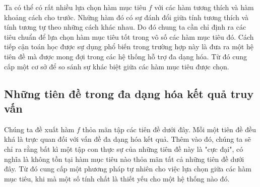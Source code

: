 \documentclass[12pt]{report}
\begin{document}
Ta có thể có rất nhiều lựa chọn hàm mục tiêu $f$ với 
các hàm tương thích và hàm khoảng cách cho trước. 
Những hàm đó có sự đánh đổi giữa tính tương thích và tính 
tương tự theo những cách khác nhau. 
Do đó chung ta cần chỉ định ra các 
tiêu chuẩn để lựa chọn hàm mục tiêu tốt trong vô số các hàm mục tiêu đó.
Cách tiếp cận toán học được sự dụng 
phổ biến trong trường hợp này là đưa ra 
một hệ tiên đề mà được mong đợi trong các hệ thống hỗ trợ đa dạng hóa. 
Từ đó cung cấp một cơ sở để so sánh sự khác biệt giữa các hàm mục tiêu được chọn. 
\subsection{Những tiên đề trong đa dạng hóa kết quả truy vấn}
Chúng ta đề xuất hàm $f$ thỏa mãn tập các tiên đề dưới đây. Mỗi một tiên đề
đều khá là trực quan đối với  vấn đề đa dạng hóa kết quả. 
Thêm vào đó, chúng ta sẽ chỉ ra rằng bất kì một tập con thực sự của những tiên đề này là "cực đại", có nghĩa là không tồn tại hàm mục tiêu nào thỏa mãn tất cả những tiên đề dưới đây. 
Từ đó cung cấp một phương pháp tự nhiên cho việc lựa chọn 
giữa các hàm mục tiêu, khi mà 
một số tính chất là thiết yếu cho một hệ thống nào đó. 
\end{document}
